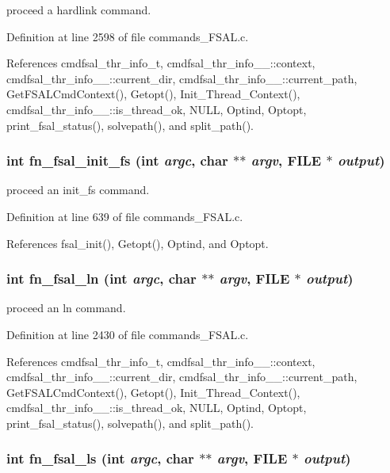 proceed a hardlink command. 

Definition at line 2598 of file commands\_\-FSAL.c.

References cmdfsal\_\-thr\_\-info\_\-t, cmdfsal\_\-thr\_\-info\_\-\_\-::context, cmdfsal\_\-thr\_\-info\_\-\_\-::current\_\-dir, cmdfsal\_\-thr\_\-info\_\-\_\-::current\_\-path, Get\-FSALCmd\-Context(), Getopt(), Init\_\-Thread\_\-Context(), cmdfsal\_\-thr\_\-info\_\-\_\-::is\_\-thread\_\-ok, NULL, Optind, Optopt, print\_\-fsal\_\-status(), solvepath(), and split\_\-path().
\subsubsection{\setlength{\rightskip}{0pt plus 5cm}int fn\_\-fsal\_\-init\_\-fs (int {\em argc}, char $\ast$$\ast$ {\em argv}, FILE $\ast$ {\em output})}\label{commands__FSAL_8c_a17}


proceed an init\_\-fs command. 

Definition at line 639 of file commands\_\-FSAL.c.

References fsal\_\-init(), Getopt(), Optind, and Optopt.
\subsubsection{\setlength{\rightskip}{0pt plus 5cm}int fn\_\-fsal\_\-ln (int {\em argc}, char $\ast$$\ast$ {\em argv}, FILE $\ast$ {\em output})}\label{commands__FSAL_8c_a30}


proceed an ln command. 

Definition at line 2430 of file commands\_\-FSAL.c.

References cmdfsal\_\-thr\_\-info\_\-t, cmdfsal\_\-thr\_\-info\_\-\_\-::context, cmdfsal\_\-thr\_\-info\_\-\_\-::current\_\-dir, cmdfsal\_\-thr\_\-info\_\-\_\-::current\_\-path, Get\-FSALCmd\-Context(), Getopt(), Init\_\-Thread\_\-Context(), cmdfsal\_\-thr\_\-info\_\-\_\-::is\_\-thread\_\-ok, NULL, Optind, Optopt, print\_\-fsal\_\-status(), solvepath(), and split\_\-path().
\subsubsection{\setlength{\rightskip}{0pt plus 5cm}int fn\_\-fsal\_\-ls (int {\em argc}, char $\ast$$\ast$ {\em argv}, FILE $\ast$ {\em output})}\label{commands__FSAL_8c_a24}



